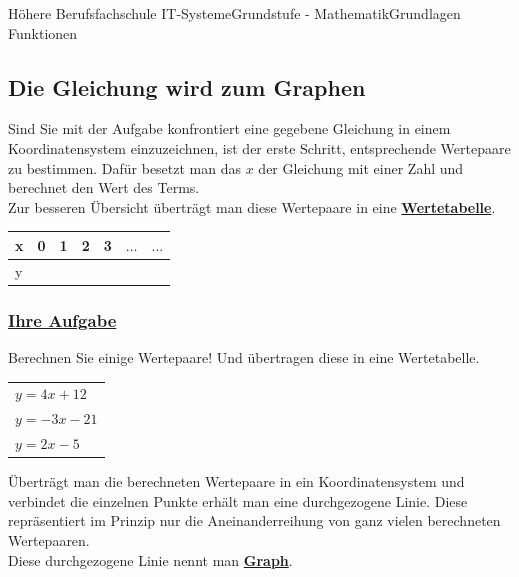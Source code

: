 \documentclass[11pt,twocolumn,oneside,openany,headings=optiontotoc,11pt,numbers=noenddot]{article}
\begin{document}
\begin{worksheet}{Höhere Berufsfachschule IT-Systeme}{Grundstufe - Mathematik}{Grundlagen Funktionen}
		\subsection{Die Gleichung wird zum Graphen}
		Sind Sie mit der Aufgabe konfrontiert eine gegebene Gleichung in einem Koordinatensystem einzuzeichnen, ist der erste Schritt, entsprechende Wertepaare zu bestimmen. Dafür besetzt man das \(x\) der Gleichung mit einer Zahl und berechnet den Wert des Terms.\\
		Zur besseren Übersicht überträgt man diese Wertepaare in eine \textbf{\underline{Wertetabelle}}.\\
		\begin{tabularx}{0.45\textwidth}{|X|X|X|X|X|X|X|}
			\hline
			x & 0 & 1 & 2 & 3 & \(\ldots\) & \(\ldots\)\\
			\hline
			y & & & & & & \\
			\hline
		\end{tabularx}
		\subsubsection*{\underline{Ihre Aufgabe}} Berechnen Sie einige Wertepaare! Und übertragen diese in eine Wertetabelle.
		\begin{tabularx}{0.45\textwidth}{X}
			\(y = 4x + 12\)\\
			\(y = -3x - 21\)\\
			\(y = 2x - 5\)
		\end{tabularx}
		\par\bigskip\noindent
		Überträgt man die berechneten Wertepaare in ein Koordinatensystem und verbindet die einzelnen Punkte erhält man eine durchgezogene Linie. Diese repräsentiert im Prinzip nur die Aneinanderreihung von ganz vielen berechneten Wertepaaren.\\
		Diese durchgezogene Linie nennt man \underline{\textbf{Graph}}.

\end{worksheet}
\end{document}
